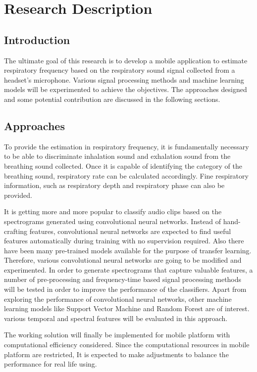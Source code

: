 \chapter{Research Description}
\section{Introduction}
The ultimate goal of this research is to develop a mobile application to estimate respiratory frequency based on the respiratory sound signal collected from a headset's microphone. Various signal processing methods and machine learning models will be experimented to achieve the objectives. The approaches designed and some potential contribution are discussed in the following sections.

\section{Approaches}
To provide the estimation in respiratory frequency, it is fundamentally necessary to be able to discriminate inhalation sound and exhalation sound from the breathing sound collected. Once it is capable of identifying the category of the breathing sound,  respiratory rate can be calculated accordingly. Fine respiratory information, such as respiratory depth and respiratory phase can also be provided.

It is getting more and more popular to classify audio clips based on the spectrograms generated using convolutional neural networks. Instead of hand-crafting features, convolutional neural networks are expected to find useful features automatically during training with no supervision required. Also there have been many pre-trained models available for the purpose of transfer learning. Therefore, various convolutional neural networks are going to be modified and experimented. In order to generate spectrograms that capture valuable features, a number of pre-processing and frequency-time based signal processing methods will be tested in order to improve the performance of the classifiers. Apart from exploring the performance of convolutional neural networks, other machine learning models like Support Vector Machine and Random Forest are of interest. various temporal and spectral features will be evaluated in this approach. 

The working solution will finally be implemented for mobile platform with computational efficiency considered. Since the computational resources in mobile platform are restricted, It is expected to make adjustments to balance the performance for real life using.

